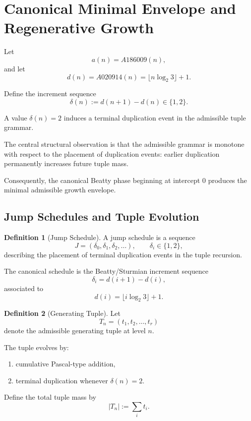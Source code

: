 \documentclass[12pt, oneside]{article}
\numberwithin{equation}{section}
\theoremstyle{definition}
\newtheorem{definition}{Definition}[section]
\theoremstyle{plain}
\theoremstyle{remark}
\begin{document}
\section{Canonical Minimal Envelope and Regenerative Growth}
\label{sec:minimal-envelope}

Let
\[
a(n)=A186009(n),
\]
and let
\[
d(n)=A020914(n)=\lfloor n\log_2 3\rfloor+1.
\]

Define the increment sequence
\[
\delta(n):=d(n+1)-d(n)\in\{1,2\}.
\]

A value $\delta(n)=2$ induces a terminal duplication event in the
admissible tuple grammar.

The central structural observation is that the admissible grammar is
monotone with respect to the placement of duplication events:
earlier duplication permanently increases future tuple mass.

Consequently, the canonical Beatty phase beginning at intercept $0$
produces the minimal admissible growth envelope.


\subsection{Jump Schedules and Tuple Evolution}


\begin{definition}[Jump Schedule]
A jump schedule is a sequence
\[
J=(\delta_0,\delta_1,\delta_2,\dots),
\qquad
\delta_i\in\{1,2\},
\]
describing the placement of terminal duplication events in the
tuple recursion.

The canonical schedule is the Beatty/Sturmian increment sequence
\[
\delta_i=d(i+1)-d(i),
\]
associated to
\[
d(i)=\lfloor i\log_2 3\rfloor+1.
\]
\end{definition}


\begin{definition}[Generating Tuple]
Let
\[
T_n=(t_1,t_2,\dots,t_r)
\]
denote the admissible generating tuple at level $n$.

The tuple evolves by:
\begin{enumerate}
\item cumulative Pascal-type addition,
\item terminal duplication whenever $\delta(n)=2$.
\end{enumerate}

Define the total tuple mass by
\[
|T_n|:=\sum_i t_i.
\]
\end{definition}
\end{document}
